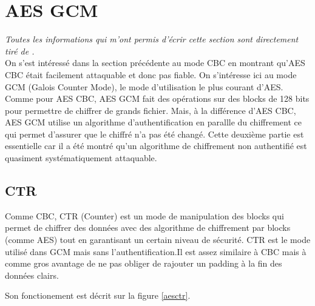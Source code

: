 \documentclass[a4paper, 12pt]{article}
\begin{document}
\section{AES GCM}
\noindent\emph{Toutes les informations qui m'ont permis d'écrir cette section sont directement tiré de \cite{courscourt}.}\\


On s'est intéressé dans la section précédente au mode CBC en montrant qu'AES CBC était facilement attaquable et donc pas fiable. On s'intéresse ici au mode GCM (Galois Counter Mode), le mode d'utilisation le plus courant d'AES. Comme pour AES CBC, AES GCM fait des opérations sur des blocks de 128 bits pour permettre de chiffrer de grands fichier. Mais, à la différence d'AES CBC, AES GCM utilise un algorithme d'authentification en parallle du chiffrement ce qui permet d'assurer que le chiffré n'a pas été changé. Cette deuxième partie est essentielle car il a été montré qu'un algorithme de chiffrement non authentifié est quasiment systématiquement attaquable.

\subsection{CTR} \label{CTR}
Comme CBC, CTR (Counter) est un mode de manipulation des blocks qui permet de chiffrer des données avec des algorithme de chiffrement par blocks (comme AES) tout en garantisant un certain niveau de sécurité. CTR est le mode utilisé dans GCM mais sans l'authentification.Il est assez similaire à CBC mais à comme gros avantage de ne pas obliger de rajouter un padding à la fin des données clairs.

Son fonctionement est décrit sur la figure \ref{aesctr}. 
\end{document}
